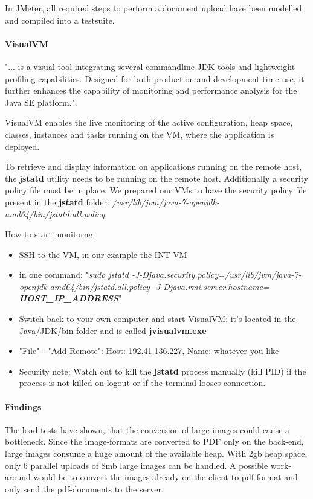 In JMeter, all required steps to perform a document upload have been modelled and compiled into a testsuite.

\paragraph{VisualVM}
"... is a visual tool integrating several commandline JDK tools and lightweight profiling capabilities. Designed for both production and development time use, it further enhances the capability of monitoring and performance analysis for the Java SE platform."\cite{visualvm}.\par 
VisualVM enables the live monitoring of the active configuration, heap space, classes, instances and tasks running on the VM, where the application is deployed.\par

To retrieve and display information on applications running on the remote host, the \textbf{jstatd} utility needs to be running on the remote host. Additionally a security policy file must be in place. We prepared our VMs to have the security policy file present in the \textbf{jstatd} folder:  \textit{/usr/lib/jvm/java-7-openjdk-amd64/bin/jstatd.all.policy}.\par

How to start monitorng:
\begin{itemize}
	\item SSH to the VM, in our example the INT VM
	\item in one command: "\textit{sudo jstatd -J-Djava.security.policy=/usr/lib/jvm/java-7-openjdk-amd64/bin/jstatd.all.policy -J-Djava.rmi.server.hostname= \textbf{HOST\_IP\_ADDRESS}}"
	\item Switch back to your own computer and start VisualVM: it’s located in the Java/JDK/bin folder and is called \textbf{jvisualvm.exe}
	\item "File" - "Add Remote": Host: 192.41.136.227, Name: whatever you like
	\item Security note: Watch out to kill the \textbf{jstatd} process manually (kill PID) if the process is not killed on logout or if the terminal looses connection.
\end{itemize}

\paragraph{Findings}
The load tests have shown, that the conversion of large images could cause a bottleneck. Since the image-formats are converted to PDF only on the back-end, large images consume a huge amount of the available heap. With 2gb heap space, only 6 parallel uploads of 8mb large images can be handled. A possible work-around would be to convert the images already on the client to pdf-format and only send the pdf-documents to the server.\par

